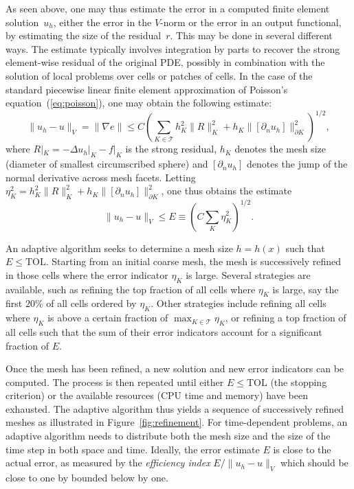 As seen above, one may thus estimate the error in a computed finite
element solution~$u_h$, either the error in the $V$-norm or the error
in an output functional, by estimating the size of the residual~$r$.
This may be done in several different ways. The estimate typically
involves integration by parts to recover the strong element-wise
residual of the original PDE, possibly in combination with the
solution of local problems over cells or patches of cells. In the case
of the standard piecewise linear finite element approximation of
Poisson's equation~(\ref{eq:poisson}), one may obtain the following
estimate:
\begin{displaymath}
  \|u_h - u\|_V = \|\nabla e\| \leq C
  \left(
  \sum_{K\in\mathcal{T}} h_K^2 \|R\|_{K}^2 +
  h_K \|[\partial_n u_h]\|_{\partial K}^2
  \right)^{1/2},
\end{displaymath}
where $R|_K = -\Delta u_h|_K - f|_K$ is the strong residual, $h_K$
denotes the mesh size (diameter of smallest circumscribed sphere) and
$[\partial_n u_h]$ denotes the jump of the normal derivative across
mesh facets. Letting $\eta_K^2 = h_K^2 \|R\|_{K}^2 + h_K \|[\partial_n
u_h]\|_{\partial K}^2$, one thus obtains the estimate
\begin{displaymath}
  \|u_h - u\|_V \leq E \equiv \left( C \sum_K \eta_K^2 \right)^{1/2}.
\end{displaymath}

An adaptive algorithm seeks to determine a mesh size $h = h(x)$ such
that $E \leq \mathrm{TOL}$. Starting from an initial coarse mesh, the
mesh is successively refined in those cells where the error indicator
$\eta_K$ is large. Several strategies are available, such as refining
the top fraction of all cells where $\eta_K$ is large, say the first
$20\%$ of all cells ordered by $\eta_K$. Other strategies include
refining all cells where $\eta_K$ is above a certain fraction of
$\max_{K\in\mathcal{T}} \eta_K$, or refining a top fraction of all
cells such that the sum of their error indicators account for a
significant fraction of $E$.


Once the mesh has been refined, a new solution and new error
indicators can be computed. The process is then repeated until either
$E \leq \mathrm{TOL}$ (the stopping criterion) or the available
resources (CPU time and memory) have been exhausted. The adaptive
algorithm thus yields a sequence of successively refined meshes as
illustrated in Figure~\ref{fig:refinement}. For time-dependent
problems, an adaptive algorithm needs to distribute both the mesh size
and the size of the time step in both space and time. Ideally, the
error estimate $E$ is close to the actual error, as measured by the
\emph{efficiency index} $E / \|u_h - u\|_V$ which should be close to
one by bounded below by one.

